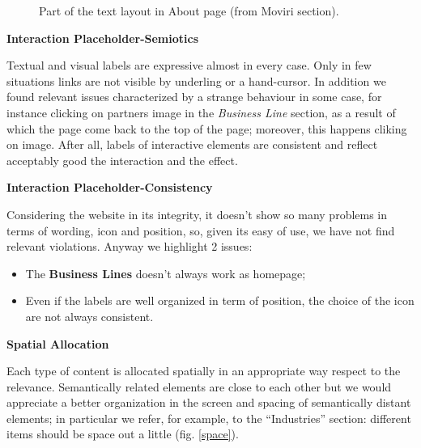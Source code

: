 \begin{figure}[H]
  \centering
  \caption{Part of the text layout in About page (from Moviri section).}
   \label{text}
\end{figure}


\textbf{Interaction Placeholder-Semiotics}\par
Textual and visual labels are expressive almost in every case. Only in few situations links are not visible by underling or a hand-cursor. In addition we found relevant issues characterized by a strange behaviour in some case, for instance clicking on partners image in the \textit{Business Line} section, as a result of which the page come back to the top of the page; moreover, this happens cliking on image. After all, labels of interactive elements are consistent and reflect acceptably good the interaction and the effect.\\

\medskip

\textbf{Interaction Placeholder-Consistency}\par
Considering the website in its integrity, it doesn’t show so many problems in terms of wording, icon and position, so, given its easy of use, we have not find relevant violations. 
Anyway we highlight 2 issues:
\begin{itemize}
\item The \textbf{Business Lines} doesn’t always work as homepage;
\item Even if the labels are well organized in term of position, the choice of the icon are not always consistent.
\end{itemize}
\medskip
\pagebreak
\textbf{Spatial Allocation}\par
Each type of content is allocated spatially in an appropriate way respect to the relevance. Semantically related elements are close to each other but we would appreciate a better organization in the screen and spacing of semantically distant elements; in particular we refer, for example, to the “Industries” section: different items should be space out a little (fig. \ref{space}). 

